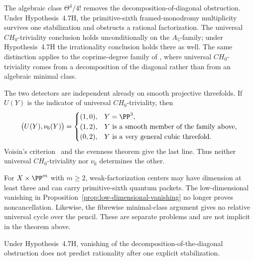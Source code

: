 The algebraic class \(\Theta^4/4!\) removes the
decomposition-of-diagonal obstruction.  Under Hypothesis~4.7H, the
primitive-sixth framed-monodromy multiplicity survives one stabilization and
obstructs a rational factorization.  The universal \(CH_0\)-triviality
conclusion holds unconditionally on the \(A_5\)-family; under
Hypothesis~4.7H the irrationality conclusion holds there as well.  The same
distinction applies to the coprime-degree family of \cite{YYZ}, where
universal \(CH_0\)-triviality comes from a decomposition of the diagonal
rather than from an algebraic minimal class.

The two detectors are independent already on smooth projective threefolds.
If \(U(Y)\) is the indicator of universal \(CH_0\)-triviality, then
\[
 \bigl(U(Y),\nu_6(Y)\bigr)=
 \begin{cases}
  (1,0),&Y=\PP^3,\\
  (1,2),&Y\text{ is a smooth member of the family above},\\
  (0,2),&Y\text{ is a very general cubic threefold}.
 \end{cases}
\]
Voisin's criterion~\cite[Corollary~4.4]{Voisin} and the evenness theorem
\cite[Theorem~1.3 and Corollary~1.4]{EdGFS} give the last line.
Thus neither universal \(CH_0\)-triviality nor \(\nu_6\) determines the other.

For \(X\times\PP^m\) with \(m\ge2\), weak-factorization centers may have dimension
at least three and can carry primitive-sixth quantum packets.  The
low-dimensional vanishing in
Proposition~\ref{prop:low-dimensional-vanishing} no longer proves
noncancellation.
Likewise, the fibrewise minimal-class argument gives no relative universal
cycle over the pencil.  These are separate problems and are not implicit in
the theorem above.

Under Hypothesis~4.7H, vanishing of the decomposition-of-the-diagonal
obstruction does not predict rationality after one explicit stabilization.
